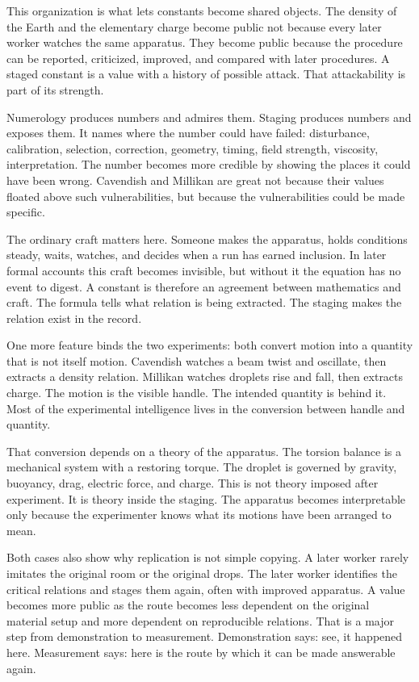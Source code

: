This organization is what lets constants become shared objects. The density
of the Earth and the elementary charge become public not because every later
worker watches the same apparatus. They become public because the procedure
can be reported, criticized, improved, and compared with later procedures. A
staged constant is a value with a history of possible attack. That
attackability is part of its strength.

Numerology produces numbers and admires them. Staging produces numbers and
exposes them. It names where the number could have failed: disturbance,
calibration, selection, correction, geometry, timing, field strength,
viscosity, interpretation. The number becomes more credible by showing the
places it could have been wrong. Cavendish and Millikan are great not
because their values floated above such vulnerabilities, but because the
vulnerabilities could be made specific.

The ordinary craft matters here. Someone makes the apparatus, holds
conditions steady, waits, watches, and decides when a run has earned
inclusion. In later formal accounts this craft becomes invisible, but
without it the equation has no event to digest. A constant is therefore an
agreement between mathematics and craft. The formula tells what relation is
being extracted. The staging makes the relation exist in the record.

One more feature binds the two experiments: both convert motion into a
quantity that is not itself motion. Cavendish watches a beam twist and
oscillate, then extracts a density relation. Millikan watches droplets rise
and fall, then extracts charge. The motion is the visible handle. The
intended quantity is behind it. Most of the experimental intelligence lives
in the conversion between handle and quantity.

That conversion depends on a theory of the apparatus. The torsion balance is
a mechanical system with a restoring torque. The droplet is governed by
gravity, buoyancy, drag, electric force, and charge. This is not theory
imposed after experiment. It is theory inside the staging. The apparatus
becomes interpretable only because the experimenter knows what its motions
have been arranged to mean.

Both cases also show why replication is not simple copying. A later worker
rarely imitates the original room or the original drops. The later worker
identifies the critical relations and stages them again, often with improved
apparatus. A value becomes more public as the route becomes less dependent
on the original material setup and more dependent on reproducible relations.
That is a major step from demonstration to measurement. Demonstration says:
see, it happened here. Measurement says: here is the route by which it can
be made answerable again.

